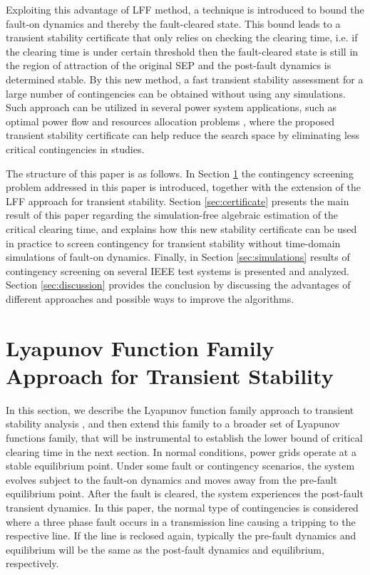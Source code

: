 \documentclass[final]{IEEEtran}
\begin{document}
Exploiting this advantage of LFF method, a technique is introduced
to bound the fault-on dynamics and thereby the fault-cleared state.
This bound leads to a transient stability certificate that only
relies on checking the clearing time, i.e. if the
clearing time is under certain threshold then the fault-cleared
state is still in the region of attraction of the original SEP and
 the post-fault dynamics
is determined stable. By this new method, a fast transient
stability assessment for a large number of contingencies can be obtained without using
any simulations. Such approach can be utilized in several power system applications, such as optimal power flow and resources
allocation problems \cite{4487649, 6575172},
where the proposed transient stability certificate can help reduce the search space by eliminating
less critical contingencies in studies.


The structure of this paper is as follows. In Section
\ref{sec:LFF} the contingency screening problem addressed 
in this paper is introduced, together with the extension of the LFF 
approach for transient stability. Section \ref{sec:certificate} 
presents the main result of this paper regarding the simulation-free algebraic estimation of the critical clearing 
time, and explains how this new stability certificate can be used in practice to 
screen contingency for transient stability without time-domain simulations of
fault-on dynamics. Finally, in Section \ref{sec:simulations} results of contingency 
screening on several IEEE test systems is presented and analyzed. 
Section \ref{sec:discussion} provides the conclusion by discussing the advantages 
of different approaches and possible ways to improve the algorithms.

\section{Lyapunov Function Family Approach for Transient Stability}
\label{sec:LFF}

In this section, we describe the Lyapunov function family approach to transient stability analysis \cite{Vu:2014}, and then extend
this family to a broader set of Lyapunov functions family, that
will be instrumental to establish the lower bound of critical
clearing time in the next section. In normal conditions, power
grids operate at a stable equilibrium point. Under some fault or
contingency scenarios, the system evolves subject to the fault-on
dynamics and moves away from the pre-fault equilibrium point.
After the fault is cleared, the system experiences the post-fault
transient dynamics. In this paper, the normal type of contingencies
is considered where a three phase fault occurs in a transmission line 
causing  a tripping to the respective line. If the line is reclosed again,
typically the pre-fault dynamics and equilibrium will be the same
as the post-fault dynamics and equilibrium, respectively.
\end{document}
